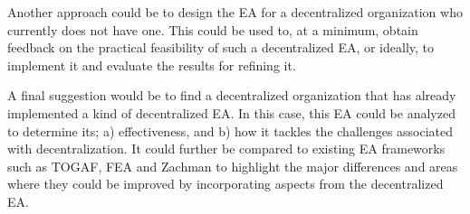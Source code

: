 Another approach could be to design the EA for a decentralized organization who currently does not have one. This could be used to, at a minimum, obtain feedback on the practical feasibility of such a decentralized EA, or ideally, to implement it and evaluate the results for refining it. 

A final suggestion would be to find a decentralized organization that has already implemented a kind of decentralized EA. In this case, this EA could be analyzed to determine its; a) effectiveness, and b) how it tackles the challenges associated with decentralization. It could further be compared to existing EA frameworks such as TOGAF, FEA and Zachman to highlight the major differences and areas where they could be improved by incorporating aspects from the decentralized EA. 